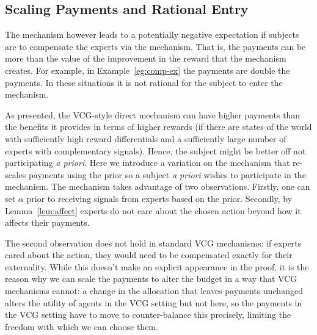 \subsection{Scaling Payments and Rational Entry}

The mechanism however leads to a potentially negative expectation if subjects are to compensate the experts via the mechanism.  
That is, the payments can be more than the value of the improvement in the reward that the mechanism creates. For example, in Example~\ref{eg:comp-ex} the payments are double the payments. In these situations it is not rational for the subject to enter the mechanism.


As presented, the VCG-style direct mechanism can have higher payments than the benefits it provides in terms of higher rewards (if there are states of the world with sufficiently high reward differentials and a sufficiently large number of experts with complementary signals). Hence, the subject might be better off not participating \emph{a priori}. Here we introduce a variation on the mechanism that re-scales payments using the prior so a subject \emph{a priori} wishes to participate in the mechanism. The mechanism takes advantage of two observations. Firstly, one can set $\alpha$ prior to receiving signals from experts based on the prior. Secondly, by Lemma~\ref{lem:affect} experts do not care about the chosen action beyond how it affects their payments. 

The second observation does not hold in standard VCG mechanisms: if experts cared about the action, they would need to be compensated exactly for their externality. While this doesn't make an explicit appearance in the proof, it is the reason why we can scale the payments to alter the budget in a way that VCG mechanisms cannot: a change in the allocation that leaves payments unchanged alters the utility of agents in the VCG setting but not here, so the payments in the VCG setting have to move to counter-balance this precisely, limiting the freedom with which we can choose them.


